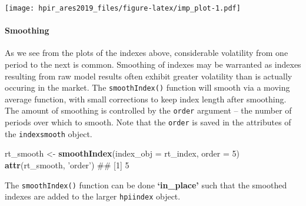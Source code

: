 \documentclass[]{article}
\newenvironment{Shaded}{\begin{snugshade}}{\end{snugshade}}
\newcommand{\DataTypeTok}[1]{\textcolor[rgb]{0.13,0.29,0.53}{#1}}
\newcommand{\DecValTok}[1]{\textcolor[rgb]{0.00,0.00,0.81}{#1}}
\newcommand{\KeywordTok}[1]{\textcolor[rgb]{0.13,0.29,0.53}{\textbf{#1}}}
\newcommand{\NormalTok}[1]{#1}
\newcommand{\OperatorTok}[1]{\textcolor[rgb]{0.81,0.36,0.00}{\textbf{#1}}}
\newcommand{\OtherTok}[1]{\textcolor[rgb]{0.56,0.35,0.01}{#1}}
\newcommand{\StringTok}[1]{\textcolor[rgb]{0.31,0.60,0.02}{#1}}
\let\oldparagraph\paragraph
\renewcommand{\paragraph}[1]{\oldparagraph{#1}\mbox{}}
\begin{document}
\begin{Shaded}
\end{Shaded}

\texttt{[image: hpir\_ares2019\_files/figure-latex/imp\_plot-1.pdf]}

\hypertarget{smoothing}{%
\paragraph{Smoothing}\label{smoothing}}

As we see from the plots of the indexes above, considerable volatility
from one period to the next is common. Smoothing of indexes may be
warranted as indexes resulting from raw model results often exhibit
greater volatility than is actually occuring in the market. The
\texttt{smoothIndex()} function will smooth via a moving average
function, with small corrections to keep index length after smoothing.
The amount of smoothing is controlled by the \texttt{order} argument --
the number of periods over which to smooth. Note that the \texttt{order}
is saved in the attributes of the \texttt{indexsmooth} object.

\begin{Shaded}
\begin{Highlighting}[]
\NormalTok{  rt_smooth <-}\StringTok{ }\KeywordTok{smoothIndex}\NormalTok{(}\DataTypeTok{index_obj =}\NormalTok{ rt_index,}
                           \DataTypeTok{order =} \DecValTok{5}\NormalTok{)}
  \KeywordTok{attr}\NormalTok{(rt_smooth, }\StringTok{'order'}\NormalTok{)}
\NormalTok{## [1] 5}
\end{Highlighting}
\end{Shaded}

The \texttt{smoothIndex()} function can be done \textbf{`in\_place'}
such that the smoothed indexes are added to the larger \texttt{hpiindex}
object.
\end{document}
